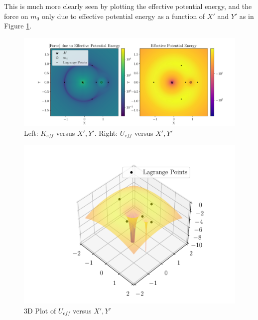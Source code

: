 \documentclass[11pt]{article}
\begin{document}
This is much more clearly seen by plotting the effective potential energy, and the force on $m_0$ only due to effective potential energy as a function of $X'$ and $Y'$ as in Figure \ref{fig:lagrange-points}.
\begin{figure}[H]
    \centering
    \includegraphics[width=0.9\linewidth]{figures/lagrange_points.pdf}
    \caption{Left: $K_{eff}$ versus $X',Y'$. Right: $U_{eff}$ versus $X',Y'$}
    \label{fig:lagrange-points}
\end{figure}

\begin{figure}[H]
    \centering
    \includegraphics[width=0.8\linewidth]{figures/effective_potential.pdf}
    \caption{3D Plot of $U_{eff}$ versus $X',Y'$}
    \label{fig:Ueff}
\end{figure}
\end{document}
